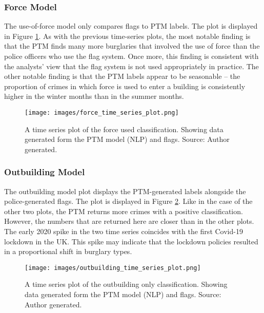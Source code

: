 \subsubsection{Force Model} The use-of-force model only compares flags to PTM labels. The plot is displayed in Figure \ref{fig:force_ts}. As with the previous time-series plots, the most notable finding is that the PTM finds many more burglaries that involved the use of force than the police officers who use the flag system. Once more, this finding is consistent with the analysts’ view that the flag system is not used appropriately in practice. The other notable finding is that the PTM labels appear to be seasonable – the proportion of crimes in which force is used to enter a building is consistently higher in the winter months than in the summer months.  


\begin{figure}
  \texttt{[image: images/force\_time\_series\_plot.png]}
  \caption[Force used model time series plot]{A time series plot of the force used classification. Showing data generated form the PTM model (NLP) and flags. Source: Author generated.}
  \label{fig:force_ts}
\end{figure}


\subsubsection{Outbuilding Model} The outbuilding model plot displays the PTM-generated labels alongside the police-generated flags. The plot is displayed in Figure \ref{fig:outbuild_ts}. Like in the case of the other two plots, the PTM returns more crimes with a positive classification. However, the numbers that are returned here are closer than in the other plots. The early 2020 spike in the two time series coincides with the first Covid-19 lockdown in the UK. This spike may indicate that the lockdown policies resulted in a proportional shift in burglary types.


\begin{figure}
  \texttt{[image: images/outbuilding\_time\_series\_plot.png]}
  \caption[Outbuilding only model time series plot]{A time series plot of the outbuilding only classification. Showing data generated form the PTM model (NLP) and flags. Source: Author generated.}
  \label{fig:outbuild_ts}
\end{figure}

